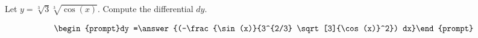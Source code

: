 \documentclass{ximera}
\author{Bart Snapp}
\begin{document}
\begin{exercise}

Let $y= \sqrt[3]{3} \sqrt[3]{\cos (x)}$. Compute the differential $dy$.

\[
\begin{prompt}dy =\answer{(-\frac{\sin (x)}{3^{2/3} \sqrt[3]{\cos (x)}^2}) dx}\end{prompt}
\]
\end{exercise}
\end{document}
